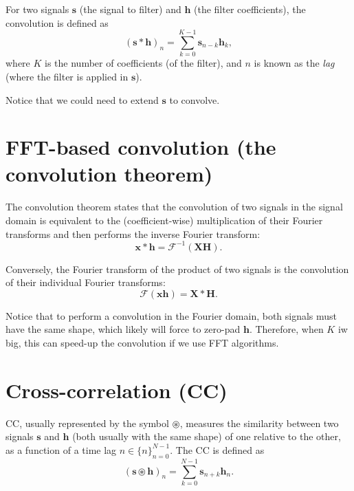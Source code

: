 For two signals $\mathbf{s}$ (the signal to filter) and
$\mathbf{h}$ (the filter coefficients), the convolution is defined as
\begin{equation}
(\mathbf{s}\ast\mathbf{h})_{n}=\sum_{k=0}^{K-1}\mathbf{s}_{n-k}\mathbf{h}_{k},
\label{eq:convolution}
\end{equation}
where $K$ is the number of coefficients (of the filter), and $n$ is known as the \emph{lag} (where the filter is applied in $\mathbf{s}$).

Notice that we could need to extend $\mathbf{s}$ to convolve.


\section{FFT-based convolution (the convolution theorem)}
\label{sec:convolution_theorem}

The convolution theorem states that the convolution of two signals in
the signal domain is equivalent to the (coefficient-wise)
multiplication of their Fourier transforms and then performs the
inverse Fourier transform:
\begin{equation}
  \mathbf{x}\ast\mathbf{h} = \mathcal{F}^{-1}(\mathbf{X}\mathbf{H}).
\end{equation}

Conversely, the Fourier transform of the product of two signals is
the convolution of their individual Fourier transforms:
\begin{equation}
  \mathcal{F}(\mathbf{x}\mathbf{h}) = \mathbf{X}\ast\mathbf{H}.
\end{equation}

Notice that to perform a convolution in the Fourier domain, both
signals must have the same shape, which likely will force to zero-pad
$\mathbf{h}$. Therefore, when $K$ iw big, this can speed-up the
convolution if we use \gls{FFT} algorithms.


\section{Cross-correlation (CC)}
\label{sec:cross-correlation}

\gls{CC}, usually represented by the symbol $\circledast$, measures
the similarity between two signals $\mathbf{s}$ and $\mathbf{h}$ (both
usually with the same shape) of one relative to the other, as a
function of a time lag $n\in\{n\}_{n=0}^{N-1}$. The \gls{CC} is
defined as
\begin{equation}
  (\mathbf{s}\circledast\mathbf{h})_n=\sum_{k=0}^{N-1}{\mathbf{s}}_{n+k} \mathbf{h}_n.
  \label{eq:cross-correlation}
\end{equation}

